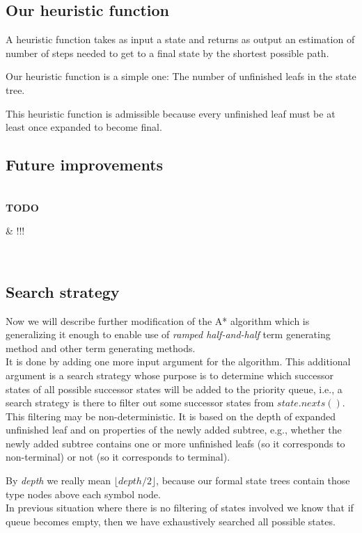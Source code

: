 \documentclass[12pt,a4paper]{report}
\newenvironment{todo}
{ ~\\[0.5em]
  {\color{red}\textbf{TODO}}
  \begin{easylist}[itemize]}
{ \end{easylist}
  ~}
\begin{document}
\subsection{Our heuristic function}

A heuristic function takes as input a state and returns as output an estimation of number
of steps needed to get to a final state by the shortest possible path.

Our heuristic function is a simple one: The number of unfinished leafs in the state tree.

This heuristic function is admissible because every unfinished
leaf must be at least once expanded to become final. 


\subsection{Future improvements}

\begin{todo}
& !!!
\end{todo}



\subsection{Search strategy}

Now we will describe further modification of the A* algorithm 
which is generalizing it enough to enable use of \textit{ramped half-and-half}
term generating method and other term generating methods.\\


It is done by adding one more input argument for the algorithm.
This additional argument is a search strategy whose purpose is
to determine which successor states of all possible successor states 
will be added to the priority queue, i.e., a search strategy 
is there to filter out some successor states from $state.nexts()$.
This filtering may be non-deterministic. It is based on
the depth of expanded unfinished leaf and on properties of 
the newly added subtree, e.g., whether the newly added subtree
contains one or more unfinished leafs (so it corresponds to non-terminal) 
or not (so it corresponds to terminal). 

By \textit{depth} we really mean $\lfloor depth/2 \rfloor$, because our 
formal state trees contain those type nodes above each symbol node. 
\\


In previous situation where there is no filtering of states involved 
we know that if queue becomes empty, then we have exhaustively searched
all possible states. 
\end{document}
